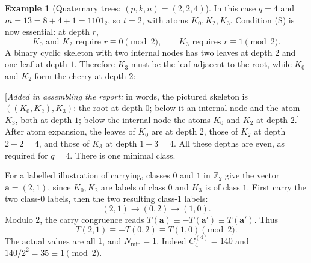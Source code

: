 \documentclass[11pt]{article}
\theoremstyle{definition}
\newtheorem{example}[theorem]{Example}
\theoremstyle{remark}
\numberwithin{equation}{section}
\numberwithin{figure}{section}
\newcommand{\Z}{\mathbb Z}
\newcommand{\assembler}[1]{[\emph{Added in assembling the report:} #1]}
\begin{document}
\begin{example}[Quaternary trees: $(p,k,n)=(2,2,4)$]\label{main:ex:quaternary}
In this case $q=4$ and $m=13=8+4+1=1101_2$, so $t=2$, with atoms $K_0,K_2,K_3$.  Condition (S) is now essential: at depth $r$,
\[
 K_0\text{ and }K_2\text{ require }r\equiv0\pmod2,
 \qquad K_3\text{ requires }r\equiv1\pmod2.
\]
A binary cyclic skeleton with two internal nodes has two leaves at depth $2$ and one leaf at depth $1$.  Therefore $K_3$ must be the leaf adjacent to the root, while $K_0$ and $K_2$ form the cherry at depth $2$:
\begin{center}
\end{center}
\assembler{in words, the pictured skeleton is $((K_0,K_2),K_3)$: the root at depth $0$; below it an
internal node and the atom $K_3$, both at depth $1$; below the internal node the atoms $K_0$ and $K_2$ at
depth $2$.}
After atom expansion, the leaves of $K_0$ are at depth $2$, those of $K_2$ at depth $2+2=4$, and those of $K_3$ at depth $1+3=4$.  All these depths are even, as required for $q=4$.  There is one minimal class.

For a labelled illustration of carrying, classes $0$ and $1$ in $\Z_2$ give the vector $\mathbf a=(2,1)$, since $K_0,K_2$ are labels of class $0$ and $K_3$ is of class $1$.  First carry the two class-$0$ labels, then the two resulting class-$1$ labels:
\[
 (2,1)\longrightarrow(0,2)\longrightarrow(1,0).
\]
Modulo $2$, the carry congruence reads $T(\mathbf a)\equiv-T(\mathbf a')\equiv T(\mathbf a')$.  Thus
\[
 T(2,1)\equiv-T(0,2)\equiv T(1,0)\pmod2.
\]
The actual values are all $1$, and $N_{\min}=1$.  Indeed $C_4^{(4)}=140$ and $140/2^2=35\equiv1\pmod2$.
\end{example}

\end{document}
